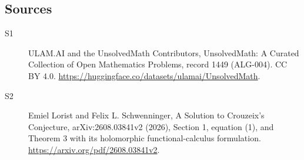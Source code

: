 \documentclass[11pt]{article}
\begin{document}
\subsection{Sources}
\begin{description}
\item[\hypertarget{source:1449:1}{S1}] ULAM.AI and the UnsolvedMath Contributors, UnsolvedMath: A Curated Collection of Open Mathematics Problems, record 1449 (ALG-004). CC BY 4.0. \url{https://huggingface.co/datasets/ulamai/UnsolvedMath}.
\item[\hypertarget{source:1449:2}{S2}] Emiel Lorist and Felix L. Schwenninger, A Solution to Crouzeix’s Conjecture, arXiv:2608.03841v2 (2026), Section 1, equation (1), and Theorem 3 with its holomorphic functional-calculus formulation. \url{https://arxiv.org/pdf/2608.03841v2}.
\end{description}
\label{end:1449}
\end{document}
